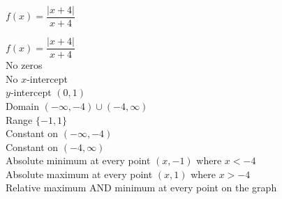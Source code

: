 {$f(x) = \dfrac{|x + 4|}{x + 4}$}
{$f(x) = \dfrac{|x + 4|}{x + 4}$ \\ No zeros \\ No $x$-intercept \\ $y$-intercept $(0, 1)$ \\ Domain $(-\infty, -4) \cup (-4, \infty)$ \\ Range $\{-1, 1\}$ \\ Constant on $(-\infty, -4)$ \\ Constant on $(-4, \infty)$ \\ Absolute minimum at every point $(x, -1)$ where $x < -4$ \\ Absolute maximum at every point $(x, 1)$ where $x > -4$ \\ Relative maximum AND minimum at every point on the graph

\begin{center}
\end{center}}